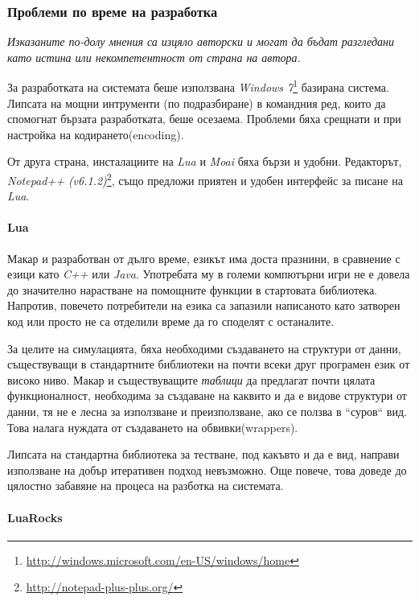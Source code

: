 \subsubsection{Проблеми по време на разработка}

	\emph{Изказаните по-долу мнения са изцяло авторски и могат да бъдат разгледани като истина или некомпетентност от страна на автора.}
	
	За разработката на системата беше използвана \emph{Windows 7}\footnote{\url{http://windows.microsoft.com/en-US/windows/home}}
	базирана система. Липсата на мощни интрументи (по подразбиране) в командния ред, които да спомогнат бързата разработката,
	беше осезаема. Проблеми бяха срещнати и при настройка на кодирането(encoding).
	
	От друга страна, инсталациите на \emph{Lua} и \emph{Moai} бяха бързи и удобни. Редакторът, 
	\emph{Notepad++ (v6.1.2)}\footnote{\url{http://notepad-plus-plus.org/}}, 
	също предложи приятен и удобен интерфейс за писане на \emph{Lua}.

	\paragraph{Lua}
		Макар и разработван от дълго време, езикът има доста празнини, в сравнение с езици като
		\emph{C++} или \emph{Java}. Употребата му в големи компютърни игри не е довела до
		значително нарастване на помощните функции в стартовата библиотека. Напротив, повечето
		потребители на езика са запазили написаното като затворен код или просто не са отделили
		време да го споделят с останалите.
		
		За целите на симулацията, бяха необходими създаването на структури от данни, съществуващи
		в стандартните библиотеки на почти всеки друг програмен език от високо ниво. Макар и
		съществуващите \emph{таблици} да предлагат почти цялата функционалност, необходима
		за създаване на каквито и да е видове структури от данни, тя не е лесна за използване
		и преизползване, ако се ползва в ``суров`` вид.	Това налага нуждата от създаването на
		обвивки(wrappers).
		
		Липсата на стандартна библиотека за тестване, под какъвто и да е вид, направи използване на
		добър итеративен подход невъзможно. Още повече, това доведе до цялостно забавяне на процеса
		на разботка на системата.
		
	\paragraph{LuaRocks}
		
